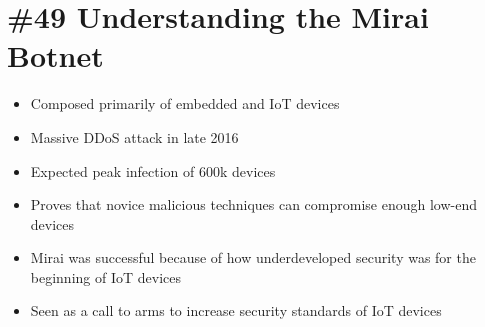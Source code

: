 \section{\#49 Understanding the Mirai Botnet}
\begin{itemize}
	\item Composed primarily of embedded and IoT devices
	\item Massive DDoS attack in late 2016
	\item Expected peak infection of 600k devices
	\item Proves that novice malicious techniques can compromise enough low-end devices
	\item Mirai was successful because of how underdeveloped security was for the beginning of IoT devices
	\item Seen as a call to arms to increase security standards of IoT devices
\end{itemize}